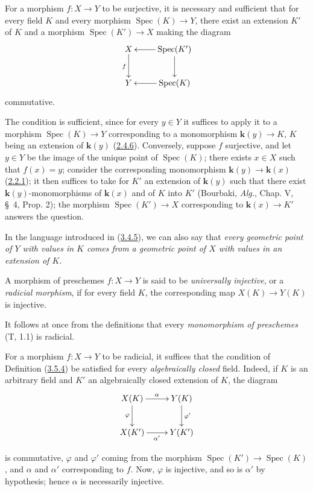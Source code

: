 \begin{proposition}[3.5.3]
\label{I.3.5.3}
For a morphism $f:X\to Y$ to be surjective, it is necessary and sufficient
that for every field $K$ and every morphism $\operatorname{Spec}(K)\to Y$,
there exist an extension $K'$ of $K$ and a morphism
$\operatorname{Spec}(K')\to X$ making the diagram
\label{I.3.5.3.surjectivity-diagram}
\[
  \xymatrix{
    X\ar[d]_f & \operatorname{Spec}(K')\ar[l]\ar[d]\\
    Y & \operatorname{Spec}(K)\ar[l]
  }
\]
commutative.
\end{proposition}

The condition is sufficient, since for every $y\in Y$ it suffices to apply it
to a morphism $\operatorname{Spec}(K)\to Y$ corresponding to a monomorphism
$\boldsymbol{k}(y)\to K$, $K$ being an extension of $\boldsymbol{k}(y)$
(\hyperref[I.2.4.6]{2.4.6}). Conversely, suppose $f$ surjective, and let
$y\in Y$ be the image of the unique point of $\operatorname{Spec}(K)$; there
exists $x\in X$ such that $f(x)=y$; consider the corresponding monomorphism
$\boldsymbol{k}(y)\to \boldsymbol{k}(x)$ (\hyperref[I.2.2.1]{2.2.1}); it then suffices to take for
$K'$ an extension of $\boldsymbol{k}(y)$ such that there exist $\boldsymbol{k}(y)$-monomorphisms of
$\boldsymbol{k}(x)$ and of $K$ into $K'$ (Bourbaki, \emph{Alg.}, Chap. V, \S~4, Prop. 2);
the morphism $\operatorname{Spec}(K')\to X$ corresponding to $\boldsymbol{k}(x)\to K'$
answers the question.

In the language introduced in (\hyperref[I.3.4.5]{3.4.5}), we can also say
that \emph{every geometric point of $Y$ with values in $K$ comes
from a geometric point of $X$ with values in an extension of $K$}.

\begin{definition}[3.5.4]
\label{I.3.5.4}
A morphism of preschemes $f:X\to Y$ is said to be \emph{universally
injective}, or a \emph{radicial morphism}, if for every field $K$,
the corresponding map $X(K)\to Y(K)$ is injective.
\end{definition}

It follows at once from the definitions that every \emph{monomorphism of
preschemes} (T, 1.1) is radicial.

\begin{env}[3.5.5]
\label{I.3.5.5}
For a morphism $f:X\to Y$ to be radicial, it suffices that the condition of
Definition (\hyperref[I.3.5.4]{3.5.4}) be satisfied for every
\emph{algebraically closed} field. Indeed, if $K$ is an arbitrary field and
$K'$ an algebraically closed extension of $K$, the diagram
\label{I.3.5.5.algebraic-closure-diagram}
\[
  \xymatrix{
    X(K)\ar[r]^\alpha\ar[d]_\varphi & Y(K)\ar[d]^{\varphi'}\\
    X(K')\ar[r]_{\alpha'} & Y(K')
  }
\]

is commutative, $\varphi$ and $\varphi'$ coming from the morphism
$\operatorname{Spec}(K')\to\operatorname{Spec}(K)$, and $\alpha$ and $\alpha'$
corresponding to $f$. Now, $\varphi$ is injective, and so is
$\alpha'$ by hypothesis; hence $\alpha$ is necessarily injective.
\end{env}

